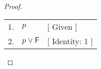 \begin{proof} \hfill\par
    \begin{tabular}{rll}
        1. & \( p \) & [ Given ] \\
        2. & \( p \lor \mathsf{F} \) & [ Identity: 1 ] \\
    \end{tabular} \par
\end{proof}
